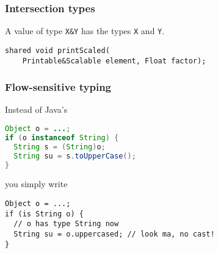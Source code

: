 \documentclass[aspectratio=169]{beamer}
\begin{document}
\begin{frame}[fragile]
  \frametitle{Intersection types}
  A value of type \lstinline{X&Y} has the types \lstinline{X} and \lstinline{Y}.
  \pause
  \begin{lstlisting}
shared void printScaled(
    Printable&Scalable element, Float factor);
  \end{lstlisting}
\end{frame}

\begin{frame}[fragile]
  \frametitle{Flow-sensitive typing}
  Instead of Java’s
  \begin{lstlisting}[language=java]
Object o = ...;
if (o instanceof String) {
  String s = (String)o;
  String su = s.toUpperCase();
}
  \end{lstlisting}
  \pause
  you simply write
  \begin{lstlisting}
Object o = ...;
if (is String o) {
  // o has type String now
  String su = o.uppercased; // look ma, no cast!
}
  \end{lstlisting}
\end{frame}
\end{document}
